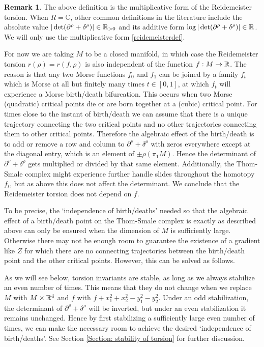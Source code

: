 \documentclass[11pt]{article}
\numberwithin{equation}{section}\providecommand{\dpl}{\displaystyle}
\theoremstyle{plain}
\theoremstyle{definition}
\newtheorem{remark}[theorem]{Remark}
\newcommand{\bC}{\mathbb{C}}\newcommand{\bD}{\mathbb{D}}
\begin{document}
\begin{remark}
The above definition is the multiplicative form of the Reidemeister torsion. When $R=\bC$, other common definitions in the literature include the absolute value $|\det(\partial^\rho+\delta^\rho)| \in \mathbb{R}_{>0}$ and its additive form $\log |\det(\partial^\rho+\delta^\rho)| \in \mathbb{R}$. We will only use the multiplicative form \ref{reidemeisterdef}.
\end{remark}

For now we are taking $M$ to be a closed manifold, in which case the Reidemeister torsion $r(\rho)=r(f, \rho)$ is also independent of the function $f:M \to \mathbb{R}$. The reason is that any two Morse functions $f_0$ and $f_1$ can be joined by a family $f_t$ which is Morse at all but finitely many times $t \in [0,1]$, at which $f_t$ will experience a Morse birth/death bifurcation. This occurs when two Morse (quadratic) critical points die or are born together at a (cubic) critical point. For times close to the instant of birth/death we can assume that there is a unique trajectory connecting the two critical points and no other trajectories connecting them to other critical points. Therefore the algebraic effect of the birth/death is to add or remove a row and column to $\partial^\rho+\delta^\rho$ with zeros everywhere except at the diagonal entry, which is an element of $\pm \rho( \pi_1M)$. Hence the determinant of $\partial^\rho+\delta^\rho$ gets multiplied or divided by that same element. Additionally, the Thom-Smale complex might experience further handle slides throughout the homotopy $f_t$, but as above this does not affect the determinant. We conclude that the Reidemeister torsion does not depend on $f$.

To be precise, the `independence of birth/deaths' needed so that the algebraic effect of a birth/death point on the Thom-Smale complex is exactly as described above can only be ensured when the dimension of $M$ is sufficiently large. Otherwise there may not be enough room to guarantee the existence of a gradient like $Z$ for which there are no connecting trajectories between the birth/death point and the other critical points. However, this can be solved as follows.

As we will see below, torsion invariants are stable, as long as we always stabilize an even number of times. This means that they do not change when we replace $M$ with $M \times \mathbb{R}^4$ and $f$ with $f +x_1^2+x_2^2 - y_1^2- y_2^2$. Under an odd stabilization, the determinant of $\partial^\rho+\delta^\rho$ will be inverted, but under an even stabilization it remains unchanged. Hence by first stabilizing a sufficiently large even number of times, we can make the necessary room to achieve the desired `independence of birth/deaths'. See Section \ref{Section: stability of torsion} for further discussion.
\end{document}
